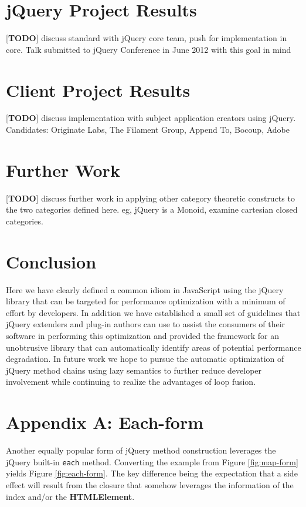 \documentclass[preprint, leqno]{sigplanconf}
\begin{document}
\section{jQuery Project Results}

[\textbf{TODO}] discuss standard with jQuery core team, push for implementation in core. Talk submitted to jQuery Conference in June 2012 with this goal in mind

\section{Client Project Results}

[\textbf{TODO}] discuss implementation with subject application creators using jQuery. Candidates: Originate Labs, The Filament Group, Append To, Bocoup, Adobe

\section{Further Work}

[\textbf{TODO}] discuss further work in applying other category theoretic constructs to the two categories defined here. eg, jQuery is a Monoid, examine cartesian closed categories.

\section{Conclusion}

Here we have clearly defined a common idiom in JavaScript using the jQuery library that can be targeted for performance optimization with a minimum of effort by developers. In addition we have established a small set of guidelines that jQuery extenders and plug-in authors can use to assist the consumers of their software in performing this optimization and provided the framework for an unobtrusive library that can automatically identify areas of potential performance degradation. In future work we hope to pursue the automatic optimization of jQuery method chains using lazy semantics to further reduce developer involvement while continuing to realize the advantages of loop fusion.

\appendix
\section{Appendix A: Each-form}

Another equally popular form of jQuery method construction leverages the jQuery built-in \verb|each| method. Converting the example from Figure \ref{fig:map-form} yields Figure \ref{fig:each-form}. The key difference being the expectation that a side effect will result from the closure that somehow leverages the information of the index and/or the \textbf{HTMLElement}.
\end{document}
